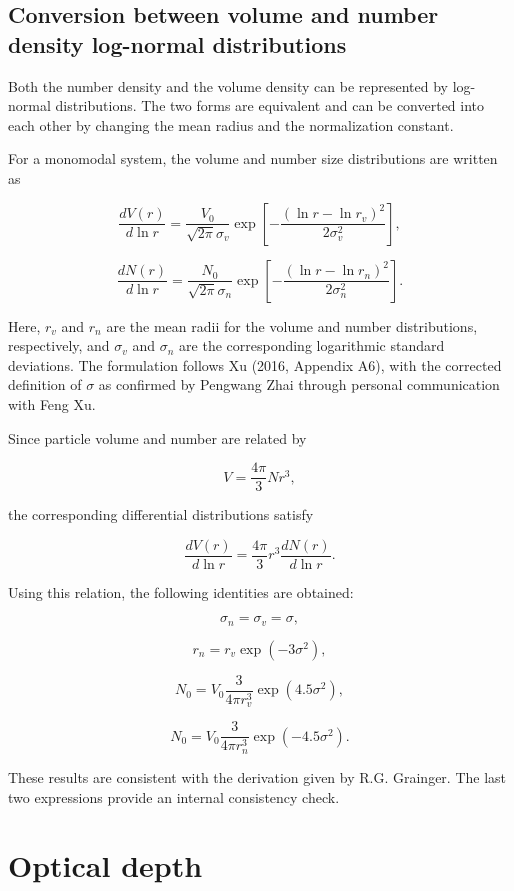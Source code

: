 \documentclass[
  letterpaper,
]{scrbook}
\begin{document}
\subsection{Conversion between volume and number density log-normal
distributions}\label{conversion-between-volume-and-number-density-log-normal-distributions}

Both the number density and the volume density can be represented by
log-normal distributions. The two forms are equivalent and can be
converted into each other by changing the mean radius and the
normalization constant.

For a monomodal system, the volume and number size distributions are
written as

\[
\frac{d V(r)}{d \ln r}= \frac{V_{0}}{\sqrt{2 \pi} \sigma_{v}} \exp\left[-\frac{(\ln r-\ln r_{v})^2}{2 \sigma_{v}^2}\right],
\]

\[
\frac{d N(r)}{d \ln r}= \frac{N_{0}}{\sqrt{2 \pi} \sigma_{n}} \exp\left[-\frac{(\ln r-\ln r_{n})^2}{2 \sigma_{n}^2}\right].
\]

Here, \(r_v\) and \(r_n\) are the mean radii for the volume and number
distributions, respectively, and \(\sigma_v\) and \(\sigma_n\) are the
corresponding logarithmic standard deviations. The formulation follows
Xu (2016, Appendix A6), with the corrected definition of \(\sigma\) as
confirmed by Pengwang Zhai through personal communication with Feng Xu.

Since particle volume and number are related by

\[
V=\frac{4\pi}{3}Nr^3,
\]

the corresponding differential distributions satisfy

\[
\frac{d V(r)}{d \ln r}=\frac{4\pi}{3} r^3 \frac{d N(r)}{d \ln r}.
\]

Using this relation, the following identities are obtained:

\[
\sigma_{n}=\sigma_{v}=\sigma,
\]

\[
r_{n}=r_{v} \exp(-3 \sigma^2),
\]

\[
N_{0}=V_{0} \frac{3}{4 \pi r_{v}^3}\exp(4.5 \sigma^2),
\]

\[
N_{0}=V_{0} \frac{3}{4 \pi r_{n}^3}\exp(-4.5 \sigma^2).
\]

These results are consistent with the derivation given by R.G. Grainger.
The last two expressions provide an internal consistency check.

\section{Optical depth}\label{optical-depth}
\end{document}
